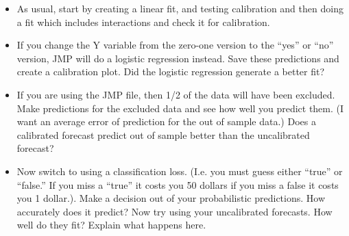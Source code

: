 \documentclass[12pt]{extarticle}
\begin{document}
\begin{itemize}
\item As usual, start by creating a linear fit, and testing
  calibration and then doing a fit which includes interactions and
  check it for calibration.
\item If you change the Y variable from the zero-one version to the
  ``yes'' or ``no'' version, JMP will do a logistic regression
  instead.  Save these predictions and create a calibration plot.  Did
  the logistic regression generate a better fit?
\item If you are using the JMP file, then 1/2 of the data will have
  been excluded.  Make predictions for the excluded data and see how
  well you predict them.  (I want an average error of prediction for
  the out of sample data.)  Does a calibrated forecast predict out of
  sample better than the uncalibrated forecast?
\item Now switch to using a classification loss. (I.e. you must guess
 either ``true'' or ``false.''  If you miss a ``true'' it costs you 50
dollars if you miss a false it costs you 1 dollar.).  Make a decision out
 of your probabilistic predictions.  How accurately does it predict?
  Now try using your uncalibrated forecasts.  How well do they fit?
  Explain what happens here.
\end{itemize}
\end{document}
